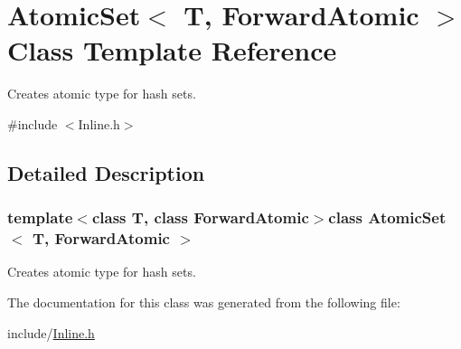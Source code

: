 \hypertarget{class_atomic_set}{}\section{Atomic\+Set$<$ T, Forward\+Atomic $>$ Class Template Reference}
\label{class_atomic_set}


Creates atomic type for hash sets.  




{\ttfamily \#include $<$Inline.\+h$>$}



\subsection{Detailed Description}
\subsubsection*{template$<$class T, class Forward\+Atomic$>$class Atomic\+Set$<$ T, Forward\+Atomic $>$}

Creates atomic type for hash sets. 

The documentation for this class was generated from the following file\+:\begin{DoxyCompactItemize}
\item 
include/\hyperlink{_inline_8h}{Inline.\+h}\end{DoxyCompactItemize}
